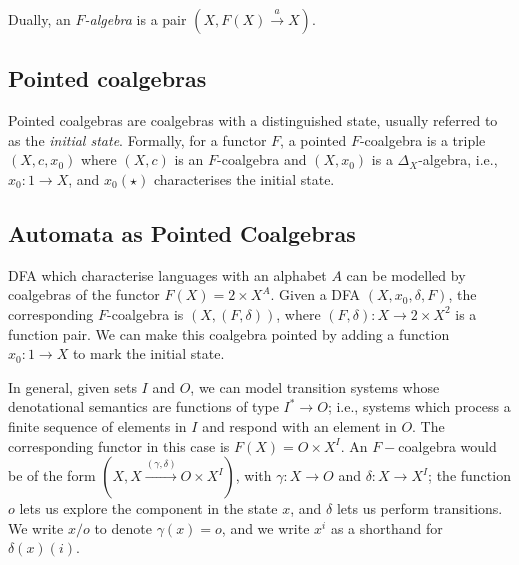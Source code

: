 Dually, an \emph{$F$-algebra} is a pair $(X,F(X)\xrightarrow{a}X)$.

\subsection{Pointed coalgebras}
Pointed coalgebras are coalgebras with a distinguished state, usually referred to as the \emph{initial state}. Formally, for a functor $F$, a pointed $F$-coalgebra is a triple $(X,c, x_0)$ where $(X,c)$ is an $F$-coalgebra and $(X, x_0)$ is a $\Delta_X$-algebra, i.e., $x_0\colon 1\rightarrow X$, and $x_0(\star)$ characterises the initial state.

\subsection{Automata as Pointed Coalgebras}
DFA which characterise languages with an alphabet $A$ can be modelled by coalgebras of the functor $F(X)=2\times X^A$. Given a DFA $(X,x_0,\delta,F)$, the corresponding $F$-coalgebra is $(X,(F,\delta))$, where $(F,\delta)\colon X\rightarrow 2\times X^2$ is a function pair. We can make this coalgebra pointed by adding a function $x_0\colon 1\rightarrow X$ to mark the initial state.

In general, given sets $I$ and $O$, we can model transition systems whose denotational semantics are functions of type $I^*\rightarrow O$; i.e., systems which process a finite sequence of elements in $I$ and respond with an element in $O$. The corresponding functor in this case is $F(X)=O\times X^I$. An $F-$coalgebra would be of the form $(X,X\xrightarrow{(\gamma,\delta)}O\times X^I)$, with $\gamma\colon X\rightarrow O$ and $\delta\colon X\rightarrow X^I$; the function $o$ lets us explore the component in the state $x$, and $\delta$ lets us perform transitions. We write $x/o$ to denote $\gamma(x)=o$, and we write $x^i$ as a shorthand for $\delta(x)(i)$. 


